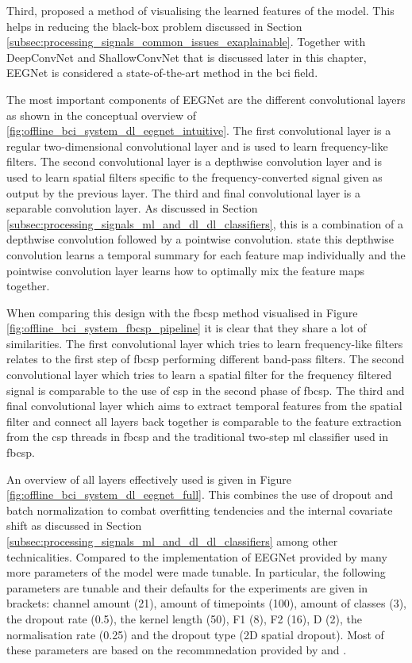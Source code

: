 Third, \citet{eeg_model_eegnet} proposed a method of visualising the learned features of the model.
This helps in reducing the black-box problem discussed in Section \ref{subsec:processing_signals_common_issues_exaplainable}.
Together with DeepConvNet and ShallowConvNet that is discussed later in this chapter, EEGNet is considered a state-of-the-art method in the \gls{bci} field.

The most important components of EEGNet are the different convolutional layers as shown in the conceptual overview of \ref{fig:offline_bci_system_dl_eegnet_intuitive}.
The first convolutional layer is a regular two-dimensional convolutional layer and is used to learn frequency-like filters.
The second convolutional layer is a depthwise convolution layer and is used to learn spatial filters specific to the frequency-converted signal given as output by the previous layer.
The third and final convolutional layer is a separable convolution layer.
As discussed in Section \ref{subsec:processing_signals_ml_and_dl_dl_classifiers}, this is a combination of a depthwise convolution followed by a pointwise convolution.
 state this depthwise convolution learns a temporal summary for each feature map individually and the pointwise convolution layer learns how to optimally mix the feature maps together.

When comparing this design with the \gls{fbcsp} method visualised in Figure \ref{fig:offline_bci_system_fbcsp_pipeline} it is clear that they share a lot of similarities.
The first convolutional layer which tries to learn frequency-like filters relates to the first step of \gls{fbcsp} performing different band-pass filters.
The second convolutional layer which tries to learn a spatial filter for the frequency filtered signal is comparable to the use of \gls{csp} in the second phase of \gls{fbcsp}.
The third and final convolutional layer which aims to extract temporal features from the spatial filter and connect all layers back together is comparable to the feature extraction from the \gls{csp} threads in \gls{fbcsp} and the traditional two-step \gls{ml} classifier used in \gls{fbcsp}.

An overview of all layers effectively used is given in Figure \ref{fig:offline_bci_system_dl_eegnet_full}.
This combines the use of dropout and batch normalization to combat overfitting tendencies and the internal covariate shift as discussed in Section \ref{subsec:processing_signals_ml_and_dl_dl_classifiers} among other technicalities.
Compared to the implementation of EEGNet provided by \citet{arl_eegmodels} many more parameters of the model were made tunable.
In particular, the following parameters are tunable and their defaults for the experiments are given in brackets: channel amount (21), amount of timepoints (100), amount of classes (3), the dropout rate (0.5), the kernel length (50), F1 (8), F2 (16), D (2), the normalisation rate (0.25) and the dropout type (2D spatial dropout).
Most of these parameters are based on the recommnedation provided by \citet{eeg_model_eegnet} and \citet{arl_eegmodels}.


